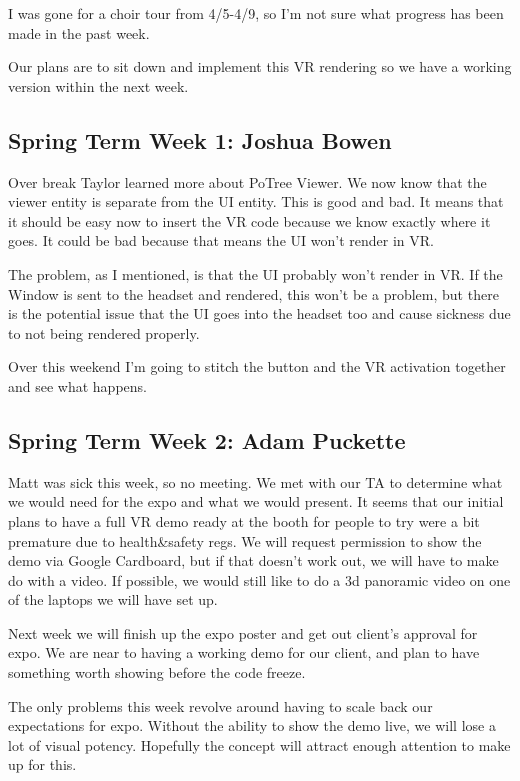 \documentclass[draftclsnofoot,onecolumn]{IEEEtran}
\begin{document}
I was gone for a choir tour from 4/5-4/9, so I'm not sure what progress has been made in the past week.

Our plans are to sit down and implement this VR rendering so we have a working version within the next week. 

\subsection{Spring Term Week 1: Joshua Bowen}

Over break Taylor learned more about PoTree Viewer. We now know that the viewer entity is separate from the UI entity. This is good and bad. It means that it should be easy now to insert the VR code because we know exactly where it goes. It could be bad because that means the UI won't render in VR.

The problem, as I mentioned, is that the UI probably won't render in VR. If the Window is sent to the headset and rendered, this won't be a problem, but there is the potential issue that the UI goes into the headset too and cause sickness due to not being rendered properly.

Over this weekend I'm going to stitch the button and the VR activation together and see what happens.

\subsection{Spring Term Week 2: Adam Puckette}

Matt was sick this week, so no meeting. We met with our TA to determine what we would need for the expo and what we would present. It seems that our initial plans to have a full VR demo ready at the booth for people to try were a bit premature due to health&safety regs. We will request permission to show the demo via Google Cardboard, but if that doesn't work out, we will have to make do with a video. If possible, we would still like to do a 3d panoramic video on one of the laptops we will have set up.

Next week we will finish up the expo poster and get out client's approval for expo. We are near to having a working demo for our client, and plan to have something worth showing before the code freeze.

The only problems this week revolve around having to scale back our expectations for expo. Without the ability to show the demo live, we will lose a lot of visual potency. Hopefully the concept will attract enough attention to make up for this.
\end{document}
